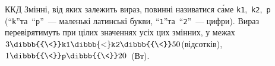 {\begin{problemAllDefault}{ККД}
Змінні, від яких залежить вираз, повинні називатися с\'{а}ме \texttt{k1},~\texttt{k2},~\texttt{p} (``\texttt{k}''\nolinebreak[3] та~``\texttt{p}''~--- маленькі латинські букви, ``\texttt{1}''\nolinebreak[3] та~``\texttt{2}''~--- цифри). 
Вираз перевірятимуть при цілих значеннях усіх цих змінних, у межах 
$3\dibbb{{\<}}\texttt{k1}\dibbb{{<}}\texttt{k2}\dibbb{{\<}}50$\nolinebreak[3] (відсотків), 
$1\dibbb{{\<}}\texttt{p}\dibbb{{\<}}20$~(Вт).


\end{problemAllDefault}

}